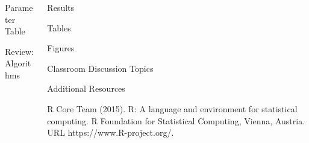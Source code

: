 \begin{frame}[t]
\begin{columns}[t]
\begin{column}{\onecolwid}
\begin{alertblock}{Parameter Table}
\end{alertblock}
\begin{alertblock}{Review: Algorithms}
\end{alertblock}
\end{column}
\begin{column}{\onecolwid} %
\begin{alertblock}{Results}
\end{alertblock}
\begin{alertblock}{Tables}
\end{alertblock}
\begin{alertblock}{Figures}
\end{alertblock}
\begin{alertblock}{Classroom Discussion Topics}
\end{alertblock}
\begin{alertblock}{Additional Resources}
\begin{enumerate}
\end{enumerate}
\end{alertblock}

\begin{thebibliography}{00}
\footnotesize		 		
{}R Core Team (2015). 
\newblock R: A language and environment for statistical computing. R Foundation for Statistical Computing, Vienna, Austria.
\newblock URL https://www.R-project.org/.		
\end{thebibliography}
\end{column}
\end{columns}
\end{frame}

